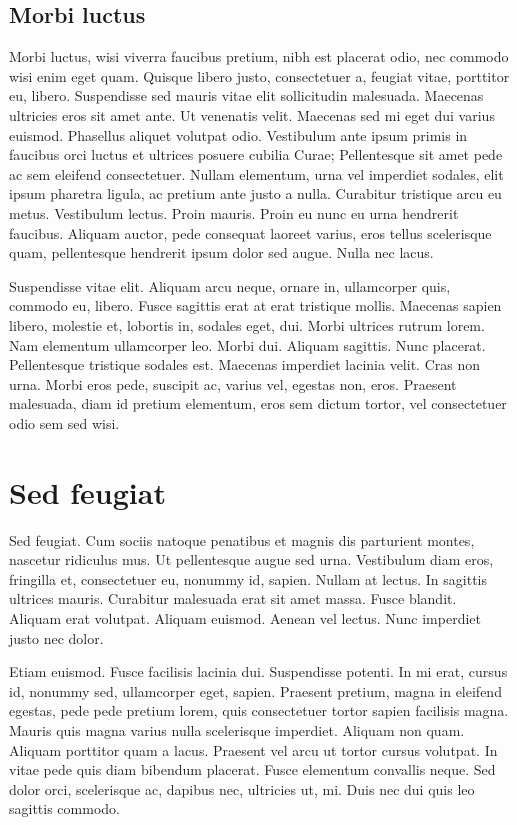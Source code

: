 \subsection{Morbi luctus}

Morbi luctus, wisi viverra faucibus pretium, nibh est placerat odio,
nec commodo wisi enim eget quam. Quisque libero justo, consectetuer a,
feugiat vitae, porttitor eu, libero. Suspendisse sed mauris vitae elit
sollicitudin malesuada. Maecenas ultricies eros sit amet ante. Ut
venenatis velit. Maecenas sed mi eget dui varius euismod. Phasellus
aliquet volutpat odio. Vestibulum ante ipsum primis in faucibus orci
luctus et ultrices posuere cubilia Curae; Pellentesque sit amet pede
ac sem eleifend consectetuer. Nullam elementum, urna vel imperdiet
sodales, elit ipsum pharetra ligula, ac pretium ante justo a
nulla. Curabitur tristique arcu eu metus. Vestibulum lectus. Proin
mauris. Proin eu nunc eu urna hendrerit faucibus. Aliquam auctor, pede
consequat laoreet varius, eros tellus scelerisque quam, pellentesque
hendrerit ipsum dolor sed augue. Nulla nec lacus.

Suspendisse vitae elit. Aliquam arcu neque, ornare in, ullamcorper
quis, commodo eu, libero. Fusce sagittis erat at erat tristique
mollis. Maecenas sapien libero, molestie et, lobortis in, sodales
eget, dui. Morbi ultrices rutrum lorem. Nam elementum ullamcorper
leo. Morbi dui. Aliquam sagittis. Nunc placerat. Pellentesque
tristique sodales est. Maecenas imperdiet lacinia velit. Cras non
urna. Morbi eros pede, suscipit ac, varius vel, egestas non,
eros. Praesent malesuada, diam id pretium elementum, eros sem dictum
tortor, vel consectetuer odio sem sed wisi.

\section{Sed feugiat}

Sed feugiat. Cum sociis natoque penatibus et magnis dis parturient
montes, nascetur ridiculus mus. Ut pellentesque augue sed
urna. Vestibulum diam eros, fringilla et, consectetuer eu, nonummy id,
sapien. Nullam at lectus. In sagittis ultrices mauris. Curabitur
malesuada erat sit amet massa. Fusce blandit. Aliquam erat
volutpat. Aliquam euismod. Aenean vel lectus. Nunc imperdiet justo nec
dolor.

Etiam euismod. Fusce facilisis lacinia dui. Suspendisse potenti. In mi
erat, cursus id, nonummy sed, ullamcorper eget, sapien. Praesent
pretium, magna in eleifend egestas, pede pede pretium lorem, quis
consectetuer tortor sapien facilisis magna. Mauris quis magna varius
nulla scelerisque imperdiet. Aliquam non quam. Aliquam porttitor quam
a lacus.  Praesent vel arcu ut tortor cursus volutpat. In vitae pede
quis diam bibendum placerat. Fusce elementum convallis neque. Sed
dolor orci, scelerisque ac, dapibus nec, ultricies ut, mi. Duis nec
dui quis leo sagittis commodo.



